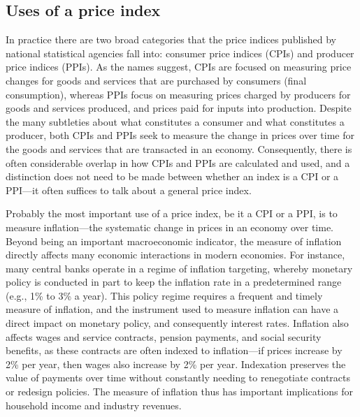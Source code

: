 \documentclass[]{article}
\begin{document}
\hypertarget{uses-of-a-price-index}{%
\subsection{Uses of a price index}\label{uses-of-a-price-index}}

In practice there are two broad categories that the price indices published by national statistical agencies fall into: consumer price indices (CPIs) and producer price indices (PPIs). As the names suggest, CPIs are focused on measuring price changes for goods and services that are purchased by consumers (final consumption), whereas PPIs focus on measuring prices charged by producers for goods and services produced, and prices paid for inputs into production. Despite the many subtleties about what constitutes a consumer and what constitutes a producer, both CPIs and PPIs seek to measure the change in prices over time for the goods and services that are transacted in an economy. Consequently, there is often
considerable overlap in how CPIs and PPIs are calculated and used, and a distinction does not need to be made between whether an index is a CPI or a PPI---it often suffices to talk about a general price index.

Probably the most important use of a price index, be it a CPI or a PPI, is to measure inflation---the systematic change in prices in an economy over time. Beyond being an important macroeconomic indicator, the measure of inflation directly affects many economic interactions in modern economies. For instance, many central banks operate in a regime of inflation targeting, whereby monetary policy is conducted in part to keep the inflation rate in a predetermined range (e.g., 1\% to 3\% a year). This policy regime requires a frequent and timely measure of inflation, and the instrument used to measure inflation can have a direct impact on monetary policy, and consequently interest rates. Inflation also affects wages and service contracts, pension payments, and social security benefits, as these contracts are often indexed to inflation---if prices increase by 2\% per year, then wages also increase by 2\% per year. Indexation preserves the value of payments over time without constantly needing to renegotiate contracts or redesign policies. The measure of inflation thus has important implications for household income and industry revenues.
\end{document}
